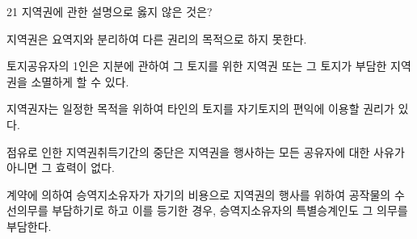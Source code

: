 \begin{question}{21}
지역권에 관한 설명으로 옳지 않은 것은?
\begin{choices}
  \item 지역권은 요역지와 분리하여 다른 권리의 목적으로 하지 못한다.
  \item 토지공유자의 1인은 지분에 관하여 그 토지를 위한 지역권 또는 그 토지가 부담한 지역권을 소멸하게 할 수 있다.
  \item 지역권자는 일정한 목적을 위하여 타인의 토지를 자기토지의 편익에 이용할 권리가 있다.
  \item 점유로 인한 지역권취득기간의 중단은 지역권을 행사하는 모든 공유자에 대한 사유가 아니면 그 효력이 없다.
  \item 계약에 의하여 승역지소유자가 자기의 비용으로 지역권의 행사를 위하여 공작물의 수선의무를 부담하기로 하고 이를 등기한 경우, 승역지소유자의 특별승계인도 그 의무를 부담한다.
\end{choices}
\end{question}
